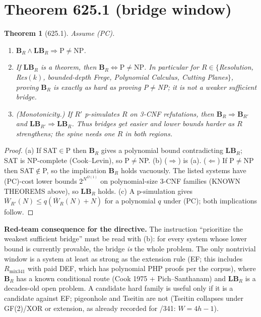 \documentclass[11pt]{article}
\newtheorem{theorem}{Theorem}
\begin{document}
\section*{Theorem 625.1 (bridge window)}
\begin{theorem}[625.1]
Assume \textsf{(PC)}.
\begin{enumerate}
\item[(a)] $\textbf{B}_R\wedge\textbf{LB}_R\Rightarrow \mathrm P\ne\mathrm{NP}$.
\item[(b)] If $\textbf{LB}_R$ is a theorem, then $\textbf{B}_R\Leftrightarrow \mathrm P\ne\mathrm{NP}$. In particular for $R\in\{$Resolution, Res$(k)$, bounded-depth Frege, Polynomial Calculus, Cutting Planes$\}$, proving $\textbf{B}_R$ is exactly as hard as proving P$\ne$NP; it is not a weaker sufficient bridge.
\item[(c)] (Monotonicity.) If $R'$ p-simulates $R$ on 3-CNF refutations, then $\textbf{B}_R\Rightarrow\textbf{B}_{R'}$ and $\textbf{LB}_{R'}\Rightarrow\textbf{LB}_R$. Thus bridges get easier and lower bounds harder as $R$ strengthens; the spine needs one $R$ in both regions.
\end{enumerate}
\end{theorem}
\begin{proof}
(a) If SAT$\in$P then $\textbf{B}_R$ gives a polynomial bound contradicting $\textbf{LB}_R$; SAT is NP-complete (Cook--Levin), so P$\ne$NP. (b) ($\Rightarrow$) is (a). ($\Leftarrow$) If P$\ne$NP then SAT$\notin$P, so the implication $\textbf{B}_R$ holds vacuously. The listed systems have \textsf{(PC)}-cost lower bounds $2^{N^{\Omega(1)}}$ on polynomial-size 3-CNF families (KNOWN THEOREMS above), so $\textbf{LB}_R$ holds. (c) A p-simulation gives $\overline W_{R'}(N)\le q(\overline W_R(N)+N)$ for a polynomial $q$ under \textsf{(PC)}; both implications follow.
\end{proof}
\noindent\textbf{Red-team consequence for the directive.} The instruction ``prioritize the weakest sufficient bridge'' must be read with (b): for every system whose lower bound is currently provable, the bridge \emph{is} the whole problem. The only nontrivial window is a system at least as strong as the extension rule (EF; this includes $R_{\mathrm{mix341}}$ with paid DEF, which has polynomial PHP proofs per the corpus), where \textbf{B}$_R$ has a known conditional route (Cook 1975 + Pich--Santhanam) and \textbf{LB}$_R$ is a decades-old open problem. A candidate hard family is useful only if it is a candidate against EF; pigeonhole and Tseitin are not (Tseitin collapses under GF(2)/XOR or extension, as already recorded for /341: $W=4h-1$).
\end{document}
